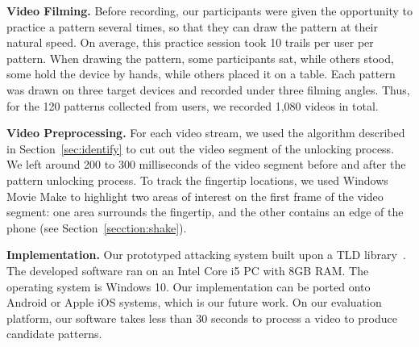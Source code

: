     \vspace{2mm}
    \noindent \textbf{Video Filming.}
     Before recording, our participants were given the opportunity to practice a pattern
    several times, so that they can draw the pattern at
    their natural speed. On average, this practice session took 10 trails per user per pattern.
    When drawing the
    pattern, some participants sat, while others stood, some hold the device
    by hands, while others placed it on a table.
    Each pattern was drawn on three target devices and
    recorded under three filming angles. Thus, for the 120 patterns collected from users, we recorded 1,080 videos in total.

    \vspace{2mm}
    \noindent\textbf{Video Preprocessing.}
    For each video stream, we used the algorithm described in Section~\ref{sec:identify} to cut out the video segment
    of the unlocking process. We left around 200 to 300 milliseconds of the video segment before and after the pattern unlocking process.
    To track the fingertip locations,
    we used Windows Movie Make to highlight two areas of interest on the first frame of
    the video segment: one area surrounds the fingertip, and the other contains an edge of the
    phone (see Section~\ref {secction:shake}).

    \vspace{2mm}
   \noindent\textbf{Implementation.} Our prototyped attacking system built upon a TLD library~\cite{TLD-toolbox-web}.
    The developed software ran on an Intel Core i5 PC with
    8GB RAM. The operating system is Windows 10. Our implementation can be ported onto
    Android or Apple iOS systems, which is our future work. On our evaluation
    platform, our software takes less than 30 seconds to process a video to produce candidate patterns.
